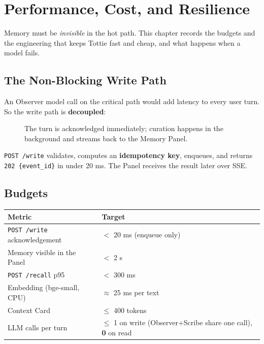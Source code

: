 \chapter{Performance, Cost, and Resilience}

Memory must be \emph{invisible} in the hot path. This chapter records the budgets and the engineering
that keeps Tottie fast and cheap, and what happens when a model fails.

\section{The Non-Blocking Write Path}
An Observer model call on the critical path would add latency to every user turn. So the write path is
\textbf{decoupled}:
\begin{figure}[H]
\centering
{}
\caption{The turn is acknowledged immediately; curation happens in the background and streams back to
the Memory Panel.}
\end{figure}
\texttt{POST /write} validates, computes an \textbf{idempotency key}, enqueues, and returns
\texttt{202 \{event\_id\}} in under 20 ms. The Panel receives the result later over SSE.

\section{Budgets}
\begin{longtable}{@{}p{}p{}@{}}
\toprule
Metric & Target \\
\midrule
\texttt{POST /write} acknowledgement & $<$ 20 ms (enqueue only) \\
Memory visible in the Panel & $<$ 2 s \\
\texttt{POST /recall} p95 & $<$ 300 ms \\
Embedding (bge-small, CPU) & $\approx$ 25 ms per text \\
Context Card & $\leq$ 400 tokens \\
LLM calls per turn & $\leq$ 1 on write (Observer+Scribe share one call), \textbf{0} on read \\
\bottomrule
\end{longtable}

